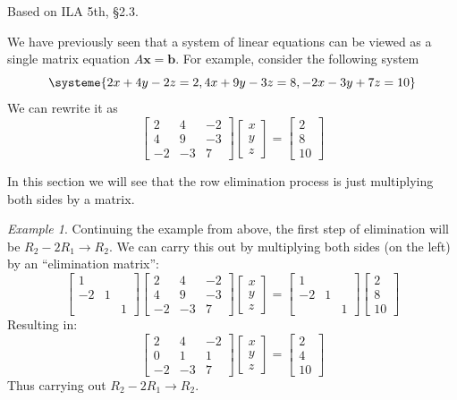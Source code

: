 \documentclass[11pt,oneside]{amsbook}
\theoremstyle{definition}
\theoremstyle{plain}
\theoremstyle{definition}
\theoremstyle{remark}
\newtheorem{example}[theorem]{Example}
\numberwithin{equation}{section}
\numberwithin{figure}{section}
\begin{document}
Based on ILA 5th, \S 2.3.

We have previously seen that a system of linear equations can be viewed as a single matrix equation $A\mathbf{x}=\mathbf{b}$. For example, consider the following system
\[\systeme{2x+4y-2z=2,4x+9y-3z=8,-2x-3y+7z=10}
\]
We can rewrite it as
\[\begin{bmatrix}2&4&-2\\4&9&-3\\-2&-3&7\end{bmatrix}
  \begin{bmatrix}x\\y\\z\end{bmatrix}
  =\begin{bmatrix}2\\8\\10\end{bmatrix}
\]

In this section we will see that the row elimination process is just multiplying both sides by a matrix.

\begin{example}
  Continuing the example from above, the first step of elimination will be $R_2-2R_1\to R_2$. We can carry this out by multiplying both sides (on the left) by an ``elimination matrix'':
  \[\begin{bmatrix}1&&\\-2&1&\\&&1\end{bmatrix}
    \begin{bmatrix}2&4&-2\\4&9&-3\\-2&-3&7\end{bmatrix}
    \begin{bmatrix}x\\y\\z\end{bmatrix}
    =\begin{bmatrix}1&&\\-2&1&\\&&1\end{bmatrix}
    \begin{bmatrix}2\\8\\10\end{bmatrix}
  \]
  Resulting in:
  \[\begin{bmatrix}2&4&-2\\0&1&1\\-2&-3&7\end{bmatrix}
    \begin{bmatrix}x\\y\\z\end{bmatrix}
    =\begin{bmatrix}2\\4\\10\end{bmatrix}
  \]
  Thus carrying out $R_2-2R_1\to R_2$.
\end{example}
\end{document}
